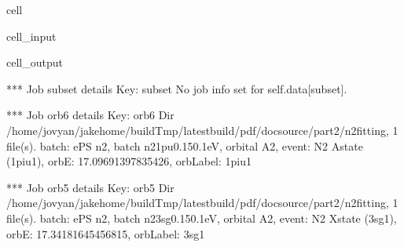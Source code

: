 \documentclass[letterpaper,table,10pt,english]{jupyterBook}
\begin{document}
\begin{sphinxuseclass}{cell}\begin{sphinxVerbatimInput}

\begin{sphinxuseclass}{cell_input}
\begin{sphinxVerbatim}[commandchars=\\\{\}]
       

\end{sphinxVerbatim}

\end{sphinxuseclass}\end{sphinxVerbatimInput}
\begin{sphinxVerbatimOutput}

\begin{sphinxuseclass}{cell_output}
\begin{sphinxVerbatim}[commandchars=\\\{\}]
*** Job subset details
Key: subset
No \PYGZsq{}job\PYGZsq{} info set for self.data[subset].

*** Job orb6 details
Key: orb6
Dir /home/jovyan/jake\PYGZhy{}home/buildTmp/\PYGZus{}latest\PYGZus{}build/pdf/doc\PYGZhy{}source/part2/n2fitting, 1 file(s).
\PYGZob{}   \PYGZsq{}batch\PYGZsq{}: \PYGZsq{}ePS n2, batch n2\PYGZus{}1pu\PYGZus{}0.1\PYGZhy{}50.1eV, orbital A2\PYGZsq{},
    \PYGZsq{}event\PYGZsq{}: \PYGZsq{} N2 A\PYGZhy{}state (1piu\PYGZhy{}1)\PYGZsq{},
    \PYGZsq{}orbE\PYGZsq{}: \PYGZhy{}17.09691397835426,
    \PYGZsq{}orbLabel\PYGZsq{}: \PYGZsq{}1piu\PYGZhy{}1\PYGZsq{}\PYGZcb{}

*** Job orb5 details
Key: orb5
Dir /home/jovyan/jake\PYGZhy{}home/buildTmp/\PYGZus{}latest\PYGZus{}build/pdf/doc\PYGZhy{}source/part2/n2fitting, 1 file(s).
\PYGZob{}   \PYGZsq{}batch\PYGZsq{}: \PYGZsq{}ePS n2, batch n2\PYGZus{}3sg\PYGZus{}0.1\PYGZhy{}50.1eV, orbital A2\PYGZsq{},
    \PYGZsq{}event\PYGZsq{}: \PYGZsq{} N2 X\PYGZhy{}state (3sg\PYGZhy{}1)\PYGZsq{},
    \PYGZsq{}orbE\PYGZsq{}: \PYGZhy{}17.34181645456815,
    \PYGZsq{}orbLabel\PYGZsq{}: \PYGZsq{}3sg\PYGZhy{}1\PYGZsq{}\PYGZcb{}
\end{sphinxVerbatim}

\end{sphinxuseclass}\end{sphinxVerbatimOutput}

\end{sphinxuseclass}
\end{document}
